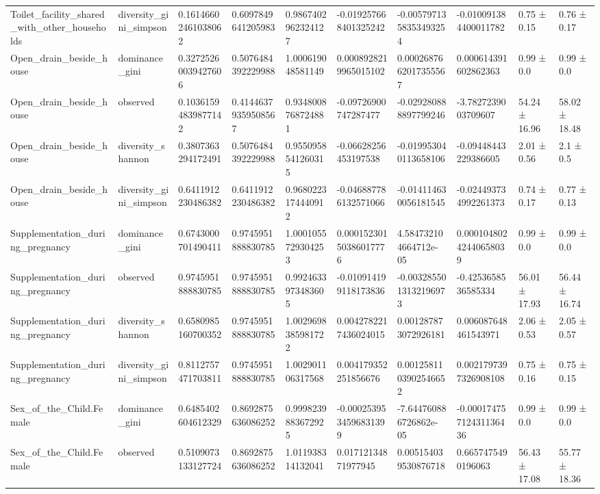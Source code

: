 \begin{longtable}{llllllllll}
Toilet\_facility\_shared\_with\_other\_households & diversity\_gini\_simpson & 0.16146602461038062 & 0.6097849641205983 & 0.9867402962324127 & -0.019257668401325242 & -0.0057971358353493254 & -0.010091384400011782 & 0.75 ± 0.15 & 0.76 ± 0.17 \\
Open\_drain\_beside\_house & dominance\_gini & 0.32725260039427606 & 0.5076484392229988 & 1.000619048581149 & 0.0008928219965015102 & 0.0002687662017355567 & 0.000614391602862363 & 0.99 ± 0.0 & 0.99 ± 0.0 \\
Open\_drain\_beside\_house & observed & 0.10361594839877142 & 0.41446379359508567 & 0.9348008768724881 & -0.09726900747287477 & -0.029280888897799246 & -3.7827239003709607 & 54.24 ± 16.96 & 58.02 ± 18.48 \\
Open\_drain\_beside\_house & diversity\_shannon & 0.3807363294172491 & 0.5076484392229988 & 0.9550958541260315 & -0.06628256453197538 & -0.019953040113658106 & -0.09448443229386605 & 2.01 ± 0.56 & 2.1 ± 0.5 \\
Open\_drain\_beside\_house & diversity\_gini\_simpson & 0.6411912230486382 & 0.6411912230486382 & 0.9680223174440912 & -0.046887786132571066 & -0.014114630056181545 & -0.024493734992261373 & 0.74 ± 0.17 & 0.77 ± 0.13 \\
Supplementation\_during\_pregnancy & dominance\_gini & 0.6743000701490411 & 0.9745951888830785 & 1.0001055729304253 & 0.00015230150386017776 & 4.584732104664712e-05 & 0.00010480242440658039 & 0.99 ± 0.0 & 0.99 ± 0.0 \\
Supplementation\_during\_pregnancy & observed & 0.9745951888830785 & 0.9745951888830785 & 0.9924633973483605 & -0.010914199118173836 & -0.0032855013132196973 & -0.4253658536585334 & 56.01 ± 17.93 & 56.44 ± 16.74 \\
Supplementation\_during\_pregnancy & diversity\_shannon & 0.6580985160700352 & 0.9745951888830785 & 1.0029698385981722 & 0.0042782217436024015 & 0.001287873072926181 & 0.006087648461543971 & 2.06 ± 0.53 & 2.05 ± 0.57 \\
Supplementation\_during\_pregnancy & diversity\_gini\_simpson & 0.8112757471703811 & 0.9745951888830785 & 1.002901106317568 & 0.004179352251856676 & 0.0012581103902546652 & 0.0021797397326908108 & 0.75 ± 0.16 & 0.75 ± 0.15 \\
Sex\_of\_the\_Child.Female & dominance\_gini & 0.6485402604612329 & 0.8692875636086252 & 0.9998239883672925 & -0.0002539534596831399 & -7.644760886726862e-05 & -0.00017475712431136436 & 0.99 ± 0.0 & 0.99 ± 0.0 \\
Sex\_of\_the\_Child.Female & observed & 0.5109073133127724 & 0.8692875636086252 & 1.011938314132041 & 0.01712134871977945 & 0.005154039530876718 & 0.6657475490196063 & 56.43 ± 17.08 & 55.77 ± 18.36 \\

\end{longtable}
